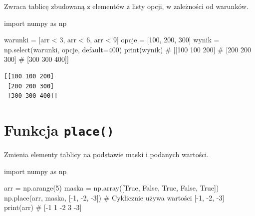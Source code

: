 \documentclass[
  letterpaper,
  DIV=11,
  numbers=noendperiod]{scrreprt}
\newenvironment{Shaded}{\begin{snugshade}}{\end{snugshade}}
\newcommand{\BuiltInTok}[1]{\textcolor[rgb]{0.00,0.23,0.31}{#1}}
\newcommand{\CommentTok}[1]{\textcolor[rgb]{0.37,0.37,0.37}{#1}}
\newcommand{\DecValTok}[1]{\textcolor[rgb]{0.68,0.00,0.00}{#1}}
\newcommand{\ImportTok}[1]{\textcolor[rgb]{0.00,0.46,0.62}{#1}}
\newcommand{\NormalTok}[1]{\textcolor[rgb]{0.00,0.23,0.31}{#1}}
\newcommand{\OperatorTok}[1]{\textcolor[rgb]{0.37,0.37,0.37}{#1}}
\newcommand{\VariableTok}[1]{\textcolor[rgb]{0.07,0.07,0.07}{#1}}
\begin{document}
Zwraca tablicę zbudowaną z elementów z listy opcji, w zależności od
warunków.

\begin{Shaded}
\begin{Highlighting}[]
\ImportTok{import}\NormalTok{ numpy }\ImportTok{as}\NormalTok{ np}

\NormalTok{warunki }\OperatorTok{=}\NormalTok{ [arr }\OperatorTok{\textless{}} \DecValTok{3}\NormalTok{, arr }\OperatorTok{\textless{}} \DecValTok{6}\NormalTok{, arr }\OperatorTok{\textless{}} \DecValTok{9}\NormalTok{]}
\NormalTok{opcje }\OperatorTok{=}\NormalTok{ [}\DecValTok{100}\NormalTok{, }\DecValTok{200}\NormalTok{, }\DecValTok{300}\NormalTok{]}
\NormalTok{wynik }\OperatorTok{=}\NormalTok{ np.select(warunki, opcje, default}\OperatorTok{=}\DecValTok{400}\NormalTok{)}
\BuiltInTok{print}\NormalTok{(wynik)}
\CommentTok{\# [[100 100 200]}
\CommentTok{\#  [200 200 300]}
\CommentTok{\#  [300 300 400]]}
\end{Highlighting}
\end{Shaded}

\begin{verbatim}
[[100 100 200]
 [200 200 300]
 [300 300 400]]
\end{verbatim}

\section{\texorpdfstring{Funkcja
\texttt{place()}}{Funkcja place()}}\label{funkcja-place}

Zmienia elementy tablicy na podstawie maski i podanych wartości.

\begin{Shaded}
\begin{Highlighting}[]
\ImportTok{import}\NormalTok{ numpy }\ImportTok{as}\NormalTok{ np}

\NormalTok{arr }\OperatorTok{=}\NormalTok{ np.arange(}\DecValTok{5}\NormalTok{)}
\NormalTok{maska }\OperatorTok{=}\NormalTok{ np.array([}\VariableTok{True}\NormalTok{, }\VariableTok{False}\NormalTok{, }\VariableTok{True}\NormalTok{, }\VariableTok{False}\NormalTok{, }\VariableTok{True}\NormalTok{])}
\NormalTok{np.place(arr, maska, [}\OperatorTok{{-}}\DecValTok{1}\NormalTok{, }\OperatorTok{{-}}\DecValTok{2}\NormalTok{, }\OperatorTok{{-}}\DecValTok{3}\NormalTok{])  }\CommentTok{\# Cyklicznie używa wartości [{-}1, {-}2, {-}3]}
\BuiltInTok{print}\NormalTok{(arr)  }\CommentTok{\# [{-}1  1 {-}2  3 {-}3]}
\end{Highlighting}
\end{Shaded}
\end{document}
